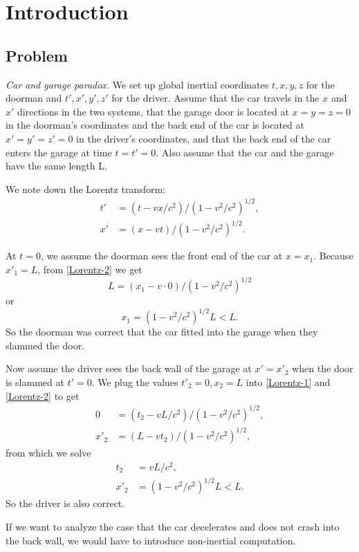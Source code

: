 \documentclass{note}
\makeatletter
\numberwithin{equation}{chapter}
\newcounter{exercise}[chapter]
\newcommand\Ex{
    \if@noskipsec \leavevmode \fi
    \par
    \refstepcounter{exercise}
    \noindent{\bfseries\arabic{exercise}.}
}
\makeatother
\begin{document}
\chapter{Introduction}

\section*{Problem}


\Ex \textit{Car and garage paradox.} We set up global inertial coordinates
$t, x, y, z$ for the doorman and $t', x', y', z'$ for the driver. Assume that
the car travels in the $x$ and $x'$ directions in the two systems, that the
garage door is located at $x = y = z = 0$ in the doorman's coordinates and the
back end of the car is located at $x' = y' = z' = 0$ in the driver's
coordinates, and that the back end of the car enters the garage at time
$t = t' = 0$. Also assume that the car and the garage have the same length L.

We note down the Lorentz transform:
\begin{align}
    t' & = (t - vx/c^2)/(1-v^2/c^2)^{1/2}, \label{Lorentz-1} \\
    x' & = (x - vt)/(1 - v^2/c^2)^{1/2}. \label{Lorentz-2}
\end{align}

At $t = 0$, we assume the doorman sees the front end of the car at $x = x_1$.
Because $x'_1 = L$, from \eqref{Lorentz-2} we get $$L = (x_1 - v\cdot 0)/(1 -
    v^2/c^2)^{1/2}$$ or $$x_1 = (1 - v^2/c^2)^{1/2}L < L.$$ So the doorman was
correct that the car fitted into the garage when they slammed the door.

Now assume the driver sees the back wall of the garage at $x' = x'_2$ when the
door is slammed at $t' = 0$. We plug the values $t'_2 = 0, x_2 = L$ into
\eqref{Lorentz-1} and \eqref{Lorentz-2} to get
\begin{align*}
    0    & = (t_2 - vL/c^2)/(1-v^2/c^2)^{1/2}, \\
    x'_2 & = (L - vt_2)/(1 - v^2/c^2)^{1/2},
\end{align*}
from which we solve
\begin{align*}
    t_2  & = vL/c^2,                   \\
    x'_2 & = (1 - v^2/c^2)^{1/2}L < L.
\end{align*}
So the driver is also correct.

If we want to analyze the case that the car decelerates and does not crash into
the back wall, we would have to introduce non-inertial computation.
\end{document}
